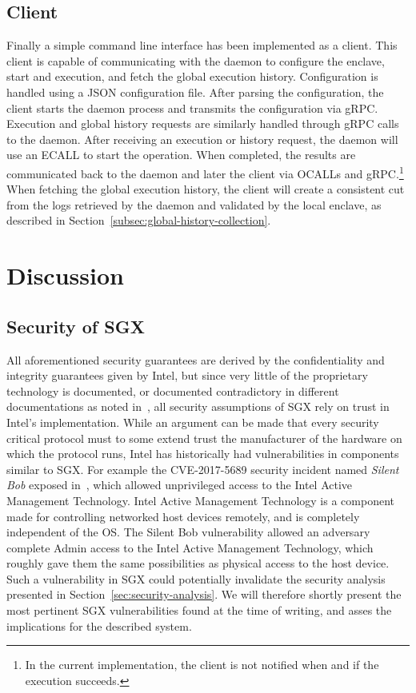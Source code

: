 \documentclass{article}
\begin{document}
	\subsection{Client}
	Finally a simple command line interface has been implemented as a client.
	This client is capable of communicating with the daemon to configure the enclave, start and execution, and fetch the global execution history.
	Configuration is handled using a JSON configuration file.
	After parsing the configuration, the client starts the daemon process and transmits the configuration via gRPC.
	Execution and global history requests are similarly handled through gRPC calls to the daemon.
	After receiving an execution or history request, the daemon will use an ECALL to start the operation.
	When completed, the results are communicated back to the daemon and later the client via OCALLs and gRPC.\footnote{In the current implementation, the client is not notified when and if the execution succeeds.}
	When fetching the global execution history, the client will create a consistent cut from the logs retrieved by the daemon and validated by the local enclave, as described in Section~\ref{subsec:global-history-collection}.

	\section{Discussion}

    \subsection{Security of SGX}
	All aforementioned security guarantees are derived by the confidentiality and integrity guarantees given by Intel, but since very little of the proprietary technology is documented, or documented contradictory in different documentations as noted in~\cite{costan_intel_2016}, all security assumptions of SGX rely on trust in Intel's implementation.
    While an argument can be made that every security critical protocol must to some extend trust the manufacturer of the hardware on which the protocol runs, Intel has historically had vulnerabilities in components similar to SGX.
    For example the CVE-2017-5689 security incident named \textit{Silent Bob} exposed in~\cite{silent_bob}, which allowed unprivileged access to the Intel Active Management Technology.
    Intel Active Management Technology is a component made for controlling networked host devices remotely, and is completely independent of the OS.
    The Silent Bob vulnerability allowed an adversary complete Admin access to the Intel Active Management Technology, which roughly gave them the same possibilities as physical access to the host device.
    Such a vulnerability in SGX could potentially invalidate the security analysis presented in Section~\ref{sec:security-analysis}.
    We will therefore shortly present the most pertinent SGX vulnerabilities found at the time of writing, and asses the implications for the described system.
\end{document}
